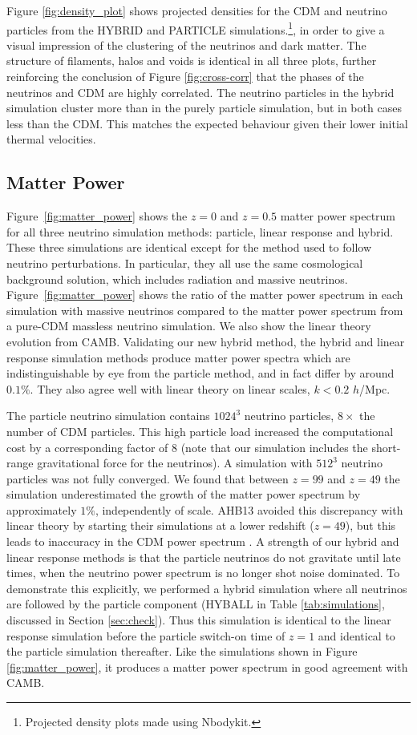 \documentclass[useAMS, usenatbib]{mnras}
\begin{document}
Figure \ref{fig:density_plot} shows projected densities for the CDM and neutrino particles from the HYBRID and PARTICLE simulations.\footnote{Projected density plots made using Nbodykit.}, in order to give a visual impression of the clustering of the neutrinos and dark matter. The structure of filaments, halos and voids is identical in all three plots, further reinforcing the conclusion of Figure \ref{fig:cross-corr} that the phases of the neutrinos and CDM are highly correlated. The neutrino particles in the hybrid simulation cluster more than in the purely particle simulation, but in both cases less than the CDM. This matches the expected behaviour given their lower initial thermal velocities.

\subsection{Matter Power}
\label{sec:matterpower}

Figure~\ref{fig:matter_power} shows the $z=0$ and $z=0.5$ matter power spectrum for all three neutrino simulation methods: particle, linear response and hybrid. These three simulations are identical except for the method used to follow neutrino perturbations. In particular, they all use the same cosmological background solution, which includes radiation and massive neutrinos. Figure~\ref{fig:matter_power} shows the ratio of the matter power spectrum in each simulation with massive neutrinos compared to the matter power spectrum from a pure-CDM massless neutrino simulation. We also show the linear theory evolution from CAMB. Validating our new hybrid method, the hybrid and linear response simulation methods produce matter power spectra which are indistinguishable by eye from the particle method, and in fact differ by around $0.1\%$. They also agree well with linear theory on linear scales, $k < 0.2$ $h$/Mpc.

The particle neutrino simulation contains $1024^3$ neutrino particles, $8\times$ the number of CDM particles. This high particle load increased the computational cost by a corresponding factor of $8$ (note that our simulation includes the short-range gravitational force for the neutrinos). A simulation with $512^3$ neutrino particles was not fully converged. We found that between $z=99$ and $z=49$ the simulation underestimated the growth of the matter power spectrum by approximately $1\%$, independently of scale. AHB13 avoided this discrepancy with linear theory by starting their simulations at a lower redshift ($z=49$), but this leads to inaccuracy in the CDM power spectrum \citep{Heitmann:2010}. A strength of our hybrid and linear response methods is that the particle neutrinos do not gravitate until late times, when the neutrino power spectrum is no longer shot noise dominated. To demonstrate this explicitly, we performed a hybrid simulation where all neutrinos are followed by the particle component (HYBALL in Table \ref{tab:simulations}, discussed in Section \ref{sec:check}). Thus this simulation is identical to the linear response simulation before the particle switch-on time of $z=1$ and identical to the particle simulation thereafter. Like the simulations shown in Figure \ref{fig:matter_power}, it produces a matter power spectrum in good agreement with CAMB.
\end{document}
